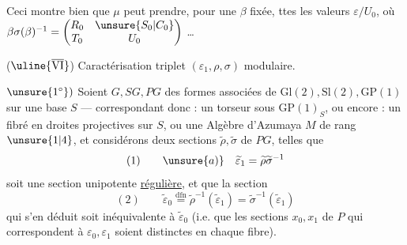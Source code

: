 Ceci montre bien que $\mu$  peut prendre, pour une $\beta$ fixée, ttes les valeurs $\varepsilon/U_0$, où $\beta\sigma(\beta)^{-1}=\begin{pmatrix}R_0&\unsure{S_0|C_0}\\T_0&U_0\end{pmatrix}$ \ldots
{}

($\uline{\overline{\mathrm{VI}}}$) Caractérisation  triplet $(\varepsilon_1,\rho,\sigma)$ modulaire.

$\unsure{1^\circ})$ Soient $G,SG,PG$ des formes associées de $\mathrm{Gl}(2),\mathrm{Sl}(2),\mathrm{GP}(1)$ sur une base $S$ --- correspondant donc : un torseur sous $\mathrm{GP}(1)_S$, ou encore : un fibré en droites projectives  sur $S$, ou une Algèbre d'Azumaya $M$ de rang $\unsure{1|4}$, et considérons deux sections  $\widetilde\rho,\widetilde\sigma$ de $PG$, telles que
\[
(1)\qquad \unsure{a)}\quad\widetilde\varepsilon_1=\widetilde\rho\widetilde\sigma^{-1}
\]
soit  une section unipotente \uline{régulière}, et que la section
\[
(2)\qquad \widetilde\varepsilon_0\overset{\mathrm{dfn}}=\widetilde\rho^{-1}(\widetilde\varepsilon_1)=\widetilde\sigma^{-1}(\widetilde\varepsilon_1)
\]
qui s'en déduit soit   inéquivalente à $\widetilde\varepsilon_0$ (i.e. que les sections $x_0,x_1$ de $P$ qui correspondent à $\varepsilon_0,\varepsilon_1$ soient  distinctes en chaque fibre).


